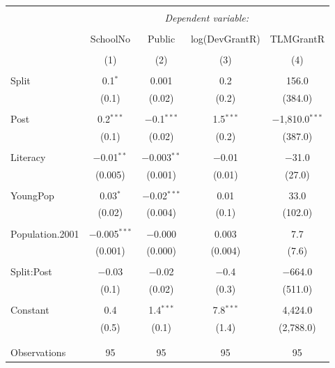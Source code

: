 \documentclass[12pt, a4paper]{article}
\begin{document}
	\begin{table}[!htbp] \centering 
		\caption{} 
		\label{} 
		\begin{tabular}{@{\extracolsep{5pt}}lcccc} 
			\\[-1.8ex]\hline 
			\hline \\[-1.8ex] 
			& \multicolumn{4}{c}{\textit{Dependent variable:}} \\ 
			\cline{2-5} 
			\\[-1.8ex] & SchoolNo & Public & log(DevGrantR) & TLMGrantR \\ 
			\\[-1.8ex] & (1) & (2) & (3) & (4)\\ 
			\hline \\[-1.8ex] 
			Split & 0.1$^{*}$ & 0.001 & 0.2 & 156.0 \\ 
			& (0.1) & (0.02) & (0.2) & (384.0) \\ 
			& & & & \\ 
			Post & 0.2$^{***}$ & $-$0.1$^{***}$ & 1.5$^{***}$ & $-$1,810.0$^{***}$ \\ 
			& (0.1) & (0.02) & (0.2) & (387.0) \\ 
			& & & & \\ 
			Literacy & $-$0.01$^{**}$ & $-$0.003$^{**}$ & $-$0.01 & $-$31.0 \\ 
			& (0.005) & (0.001) & (0.01) & (27.0) \\ 
			& & & & \\ 
			YoungPop & 0.03$^{*}$ & $-$0.02$^{***}$ & 0.01 & 33.0 \\ 
			& (0.02) & (0.004) & (0.1) & (102.0) \\ 
			& & & & \\ 
			Population.2001 & $-$0.005$^{***}$ & $-$0.000 & 0.003 & 7.7 \\ 
			& (0.001) & (0.000) & (0.004) & (7.6) \\ 
			& & & & \\ 
			Split:Post & $-$0.03 & $-$0.02 & $-$0.4 & $-$664.0 \\ 
			& (0.1) & (0.02) & (0.3) & (511.0) \\ 
			& & & & \\ 
			Constant & 0.4 & 1.4$^{***}$ & 7.8$^{***}$ & 4,424.0 \\ 
			& (0.5) & (0.1) & (1.4) & (2,788.0) \\ 
			& & & & \\ 
			\hline \\[-1.8ex] 
			Observations & 95 & 95 & 95 & 95 \\ 

\end{tabular}
\end{table}
\end{document}
